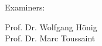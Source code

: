 \begin{center}
\begin{minipage}[b]{0.35\textwidth}
    Examiners:              \\
    \begin{hsheadfont}
    Prof. Dr. Wolfgang Hönig \\ 
    Prof. Dr. Marc Toussaint \\~\\
    \end{hsheadfont}
\end{minipage}
\end{center}
    














\restoregeometry
